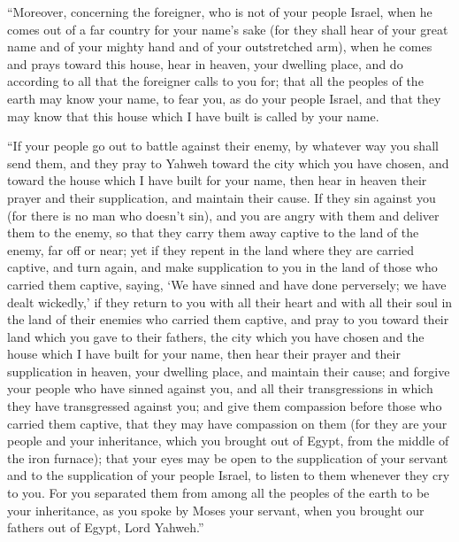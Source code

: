  ``Moreover, concerning the foreigner, who is not of your
people Israel, when he comes out of a far country for your name's sake
 (for they shall hear of your great name and of your mighty
hand and of your outstretched arm), when he comes and prays toward this
house,  hear in heaven, your dwelling place, and do
according to all that the foreigner calls to you for; that all the
peoples of the earth may know your name, to fear you, as do your people
Israel, and that they may know that this house which I have built is
called by your name.

 ``If your people go out to battle against their enemy, by
whatever way you shall send them, and they pray to Yahweh toward the
city which you have chosen, and toward the house which I have built for
your name,  then hear in heaven their prayer and their
supplication, and maintain their cause.  If they sin
against you (for there is no man who doesn't sin), and you are angry
with them and deliver them to the enemy, so that they carry them away
captive to the land of the enemy, far off or near;  yet if
they repent in the land where they are carried captive, and turn again,
and make supplication to you in the land of those who carried them
captive, saying, `We have sinned and have done perversely; we have dealt
wickedly,'  if they return to you with all their heart and
with all their soul in the land of their enemies who carried them
captive, and pray to you toward their land which you gave to their
fathers, the city which you have chosen and the house which I have built
for your name,  then hear their prayer and their
supplication in heaven, your dwelling place, and maintain their cause;
 and forgive your people who have sinned against you, and
all their transgressions in which they have transgressed against you;
and give them compassion before those who carried them captive, that
they may have compassion on them  (for they are your people
and your inheritance, which you brought out of Egypt, from the middle of
the iron furnace);  that your eyes may be open to the
supplication of your servant and to the supplication of your people
Israel, to listen to them whenever they cry to you.  For
you separated them from among all the peoples of the earth to be your
inheritance, as you spoke by Moses your servant, when you brought our
fathers out of Egypt, Lord Yahweh.''

